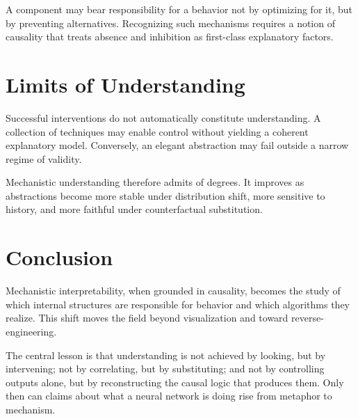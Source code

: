 \documentclass[11pt]{article}
\begin{document}
A component may bear responsibility for a behavior not by optimizing for it, but
by preventing alternatives. Recognizing such mechanisms requires a notion of
causality that treats absence and inhibition as first-class explanatory factors.

\section{Limits of Understanding}

Successful interventions do not automatically constitute understanding. A
collection of techniques may enable control without yielding a coherent
explanatory model. Conversely, an elegant abstraction may fail outside a narrow
regime of validity.

Mechanistic understanding therefore admits of degrees. It improves as
abstractions become more stable under distribution shift, more sensitive to
history, and more faithful under counterfactual substitution.

\section{Conclusion}

Mechanistic interpretability, when grounded in causality, becomes the study of
which internal structures are responsible for behavior and which algorithms they
realize. This shift moves the field beyond visualization and toward
reverse-engineering.

The central lesson is that understanding is not achieved by looking, but by
intervening; not by correlating, but by substituting; and not by controlling
outputs alone, but by reconstructing the causal logic that produces them. Only
then can claims about what a neural network is doing rise from metaphor to
mechanism.
\end{document}
